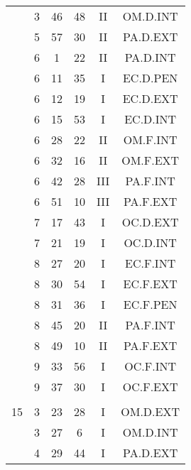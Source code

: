 \documentclass[12pt, a4paper]{article}
\begin{document}
\begin{multicols}{3}
{\begin{tabular}{c c c c c c}
	 	 	 	 & 3 & 46 & 48 & II & OM.D.INT\\%
	 	 	 	 & 5 & 57 & 30 & II & PA.D.EXT\\%
	 	 	 	 & 6 & 1 & 22 & II & PA.D.INT\\%
	 	 	 	 & 6 & 11 & 35 & I & EC.D.PEN\\%
	 	 	 	 & 6 & 12 & 19 & I & EC.D.EXT\\%
	 	 	 	 & 6 & 15 & 53 & I & EC.D.INT\\%
	 	 	 	 & 6 & 28 & 22 & II & OM.F.INT\\%
	 	 	 	 & 6 & 32 & 16 & II & OM.F.EXT\\%
	 	 	 	 & 6 & 42 & 28 & III & PA.F.INT\\%
	 	 	 	 & 6 & 51 & 10 & III & PA.F.EXT\\%
	 	 	 	 & 7 & 17 & 43 & I & OC.D.EXT\\%
	 	 	 	 & 7 & 21 & 19 & I & OC.D.INT\\%
	 	 	 	 & 8 & 27 & 20 & I & EC.F.INT\\%
	 	 	 	 & 8 & 30 & 54 & I & EC.F.EXT\\%
	 	 	 	 & 8 & 31 & 36 & I & EC.F.PEN\\%
	 	 	 	 & 8 & 45 & 20 & II & PA.F.INT\\%
	 	 	 	 & 8 & 49 & 10 & II & PA.F.EXT\\%
	 	 	 	 & 9 & 33 & 56 & I & OC.F.INT\\%
	 	 	 	 & 9 & 37 & 30 & I & OC.F.EXT\\%
	 	 	 	 & & & & & \\%
	 	 	 	15 & 3 & 23 & 28 & I & OM.D.EXT\\%
	 	 	 	 & 3 & 27 & 6 & I & OM.D.INT\\%
	 	 	 	 & 4 & 29 & 44 & I & PA.D.EXT\\%

\end{tabular}}
\end{multicols}
\end{document}
